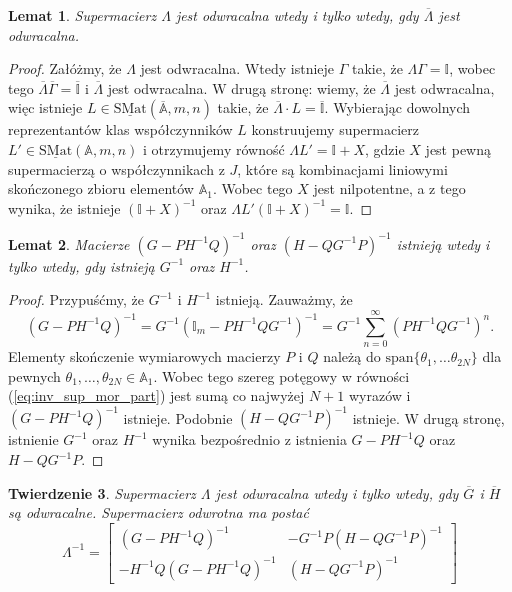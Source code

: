 \documentclass[11pt,a4paper]{report}
\newtheorem{theorem}{Twierdzenie}[section]
\newtheorem{lemma}[theorem]{Lemat}
\theoremstyle{definition}
\newcommand{\I}{\mathbb{I}}
\begin{document}
\begin{lemma}
	\label{lem:sinvert01}
	Supermacierz $\Lambda$ jest odwracalna wtedy i tylko wtedy, gdy $\overline{\Lambda}$ jest odwracalna.
\end{lemma}
\begin{proof}
	Załóżmy, że $\Lambda$ jest odwracalna. Wtedy istnieje $\Gamma$ takie, że $\Lambda \Gamma = \mathbb{I}$, wobec tego $\overline{\Lambda} \overline{\Gamma} = \overline{\mathbb{I}}$ i $\overline{\Lambda}$ jest odwracalna. W drugą stronę: wiemy, że $\overline{\Lambda}$ jest odwracalna, więc istnieje $L \in \underline{\mathrm{SMat}}(\overline{\mathbb{A}},m,n)$ takie, że $\overline{\Lambda} \cdot L = \overline{\mathbb{I}}$. Wybierając dowolnych reprezentantów klas współczynników $L$ konstruujemy supermacierz $L' \in \underline{\mathrm{SMat}}(\mathbb{A},m,n)$ i otrzymujemy równość $\Lambda L' = \mathbb{I} + X$, gdzie $X$ jest pewną supermacierzą o współczynnikach z $J$, które są kombinacjami liniowymi skończonego zbioru elementów $\mathbb{A}_1$. Wobec tego $X$ jest nilpotentne, a z tego wynika, że istnieje $(\mathbb{I}+X)^{-1}$ oraz $\Lambda L' (\mathbb{I}+X)^{-1} = \mathbb{I}$.
\end{proof}
  
\begin{lemma}
	\label{lem:sinvert02}
	Macierze $(G-PH^{-1}Q)^{-1}$ oraz $(H-QG^{-1}P)^{-1}$ istnieją wtedy i tylko wtedy, gdy istnieją $G^{-1}$ oraz $H^{-1}$.
\end{lemma}
  
\begin{proof}
	Przypuśćmy, że $G^{-1}$ i $H^{-1}$ istnieją. Zauważmy, że 
	\begin{equation}
		\label{eq:inv_sup_mor_part}
		(G-PH^{-1}Q)^{-1} = G^{-1}(\I_m - PH^{-1}QG^{-1})^{-1}=G^{-1} \sum_{n=0}^{\infty} (PH^{-1}QG^{-1})^{n}.
	\end{equation}
	Elementy skończenie wymiarowych macierzy $P$ i $Q$ należą do $\mathrm{span} \{ \theta_1, \ldots \theta_{2N} \}$ dla pewnych $\theta_1, \ldots, \theta_{2N} \in \mathbb{A}_1$. Wobec tego szereg potęgowy w równości (\ref{eq:inv_sup_mor_part}) jest sumą co najwyżej $N+1$ wyrazów i $(G-PH^{-1}Q)^{-1}$ istnieje. Podobnie $(H-QG^{-1}P)^{-1}$ istnieje. W drugą stronę, istnienie $G^{-1}$ oraz $H^{-1}$ wynika bezpośrednio z istnienia $G-PH^{-1}Q$ oraz $H-QG^{-1}P$.
\end{proof}

\begin{theorem}
	\label{thm:supermatrix_invertibility}
	Supermacierz $\Lambda$ jest odwracalna wtedy i tylko wtedy, gdy $\overline{G}$ i $\overline{H}$ są odwracalne. Supermacierz odwrotna ma postać
	\begin{equation}
		\Lambda^{-1} = \begin{bmatrix}
		(G-PH^{-1}Q)^{-1}			& 	-G^{-1}P(H-QG^{-1}P)^{-1} \\
		-H^{-1}Q(G-PH^{-1}Q)^{-1} 	& 	(H-QG^{-1}P)^{-1}
		\end{bmatrix}
	\end{equation}
\end{theorem}
  
\end{document}
